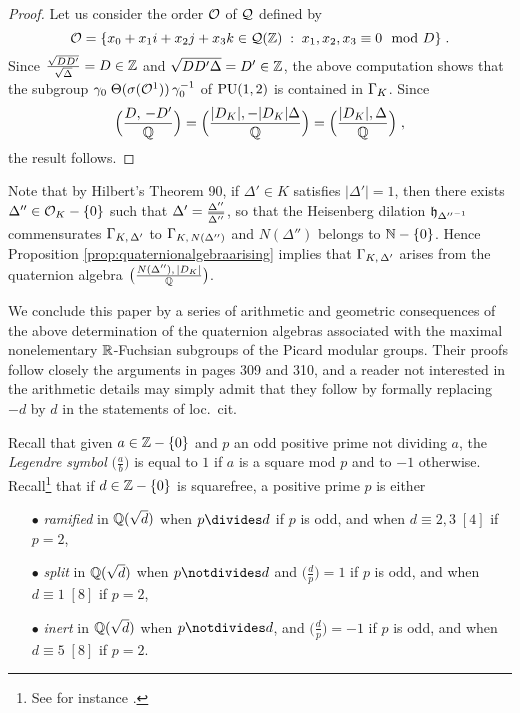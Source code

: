 \documentclass[11pt]{article}
\begin{document}
\begin{proof}
\bigskip
Let us consider the order ${\cal O}$ of ${\cal Q}$ defined by
$$
{\cal O}=\{x_0+x_1i+x_2j+x_3k\in {\cal Q}({\mathbb Z})\;:\; 
x_1,x_2,x_3\equiv 0 \mod D\}\;.
$$ 
Since $\frac{\sqrt{DD'}}{\sqrt{\Delta}}=D\in{\mathbb Z}$ and $\sqrt{DD'\Delta}
=D'\in{\mathbb Z}$, the above computation shows that the subgroup $\gamma_0\;
\Theta(\sigma({\cal O}^1))\,\gamma_0^{-1}$ of $\operatorname{PU}(1,2)$ is contained in
$\Gamma_K$. Since
$$
\Big(\frac{D,\,-D'}{{\mathbb Q}}\Big)=
\Big(\frac{|D_K|,-|D_K|\Delta}{{\mathbb Q}}\Big)=
\Big(\frac{|D_K|,\Delta}{{\mathbb Q}}\Big)\;,
$$ 
the result follows.  
\end{proof}



\medskip{} Note that by Hilbert's Theorem 90, if $\Delta'\in K$
satisfies $|\Delta'|=1$, then there exists $\Delta'' \in{\cal O}_K-\{0\}$
such that $\Delta'=\frac{\Delta''}{{\overline{\Delta''}}}$, so that the
Heisenberg dilation ${\mathfrak h}_{{\Delta''}^{-1}}$ commensurates
$\Gamma_{K,\,\Delta'}$ to $\Gamma_{K,\,N(\Delta'')}$ and $N(\Delta'')$
belongs to ${\mathbb N}-\{0\}$. Hence Proposition
\ref{prop:quaternionalgebraarising} implies that $\Gamma_{K,\,\Delta'}$
arises from the quaternion algebra
$\big(\frac{N(\Delta''),\,|D_K|}{{\mathbb Q}}\big)$.

\medskip

We conclude this paper by a series of arithmetic and geometric
consequences of the above determination of the quaternion algebras
associated with the maximal nonelementary ${\mathbb R}$-Fuchsian subgroups of
the Picard modular groups. Their proofs follow closely the arguments
in \cite{Maclachlan86} pages 309 and 310, and a reader not interested
in the arithmetic details may simply admit that they follow by
formally replacing $-d$ by $d$ in the statements of loc.~cit.

Recall that given $a\in{\mathbb Z}-\{0\}$ and $p$ an odd positive prime not
dividing $a$, the {\it Legendre symbol} $\big(\frac{a}{b}\big)$ is
equal to $1$ if $a$ is a square mod $p$ and to $-1$
otherwise. Recall\footnote{See for instance \cite[page 91]{Samuel67}.}
that if $d\in{\mathbb Z}-\{0\}$ is squarefree, a positive prime $p$ is either
\begin{itemize}
\item[$\bullet$] {\it ramified} in ${\mathbb Q}(\sqrt{d})$ when $p\divides d$
  if $p$ is odd, and when $d\equiv 2,3\;[4]$ if $p=2$,
\item[$\bullet$] {\it split} in ${\mathbb Q}(\sqrt{d})$ when $p\notdivides d$
  and $\big(\frac{d}{p}\big)=1$ if $p$ is odd, and when $d\equiv
  1\;[8]$ if $p=2$,
\item[$\bullet$] {\it inert} in ${\mathbb Q}(\sqrt{d})$ when $p\notdivides d$,
  and $\big(\frac{d}{p}\big)=-1$ if $p$ is odd, and when $d\equiv 5\;
  [8]$ if $p=2$.
\end{itemize}
\end{document}
